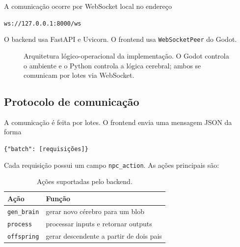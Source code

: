 \documentclass[12pt,a4paper,fleqn]{article}
\begin{document}
A comunicação ocorre por WebSocket local no endereço
\begin{center}
\texttt{ws://127.0.0.1:8000/ws}
\end{center}
O backend usa FastAPI e Uvicorn. O frontend usa \texttt{WebSocketPeer} do Godot.

\begin{figure}[H]
\centering
{}
\caption{Arquitetura lógico-operacional da implementação. O Godot controla o ambiente e o Python controla a lógica cerebral; ambos se comunicam por lotes via WebSocket.}
\label{fig:arquitetura}
\end{figure}

\subsection{Protocolo de comunicação}

A comunicação é feita por lotes. O frontend envia uma mensagem JSON da forma
\begin{center}
\texttt{\{"batch": [requisições]\}}
\end{center}
Cada requisição possui um campo \texttt{npc\_action}. As ações principais são:

\begin{table}[H]
\centering
\caption{Ações suportadas pelo backend.}
\label{tab:websocket}
\begin{tabular}{ll}
\toprule
Ação & Função \\
\midrule
\texttt{gen\_brain} & gerar novo cérebro para um blob \\
\texttt{process} & processar inputs e retornar outputs \\
\texttt{offspring} & gerar descendente a partir de dois pais \\
\bottomrule
\end{tabular}
\end{table}
\end{document}
